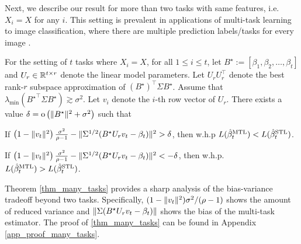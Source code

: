 Next, we describe our result for more than two tasks with same features, i.e. $X_i = X$ for any $i$.
This setting is prevalent in applications of multi-task learning to image classification, where there are multiple prediction labels/tasks for every image \cite{chexnet17,EA20}.
\begin{theorem}\label{thm_many_tasks}
	For the setting of $t$ tasks where $X_i = X$, for all $1\le i\le t$,
	let $B^\star := [{\beta}_1,{\beta}_2,\dots,{\beta}_{t}]$ and $U_r\in\mathbb{R}^{t\times r}$ denote the linear model parameters.
	Let $U_r U_r^{\top}$ denote the best rank-$r$ subspace approximation of $(B^{\star})^\top\Sigma B^{\star}$.
	Assume that $\lambda_{\min}({B^{\star}}^\top\Sigma B^{\star})\gtrsim \sigma^2$.
	Let $v_i$ denote the $i$-th row vector of $U_r$.
	There exists a value $\delta = \operatorname{o} \left( \|B^\star\|^2 + \sigma^2\right)$ such that
	\squishlist
		\item  If	$\left(1 - \|v_t\|^2 \right)\frac{\sigma^2}{\rho - 1} - \|\Sigma^{1/2} (B^{\star} U_r v_t - \beta_t)\|^2 > \delta$, then w.h.p $L(\hat{\beta}_t^{\textup{MTL}}) < L(\hat{\beta}_t^{\textup{STL}})$.
		\item If $\left(1 - \|v_t\|^2\right)\frac{\sigma^2}{\rho - 1} - \|\Sigma^{1/2}(B^{\star} U_r v_t - \beta_t)\|^2 < -\delta$, then w.h.p. $L(\hat{\beta}_t^{\textup{MTL}}) > L(\hat{\beta}_t^{\textup{STL}})$.
	\squishend
\end{theorem}
Theorem \ref{thm_many_tasks} provides a sharp analysis of the bias-variance tradeoff beyond two tasks.
Specifically, $(1 - \|v_t\|^2)\sigma^2/(\rho - 1)$ shows the amount of reduced variance and $\|\Sigma (B^{\star} U_r v_t - \beta_t)\|$ shows the bias of the multi-task estimator.
The proof of \ref{thm_many_tasks} can be found in Appendix \ref{app_proof_many_tasks}.










